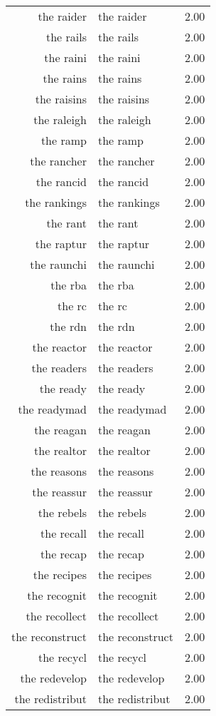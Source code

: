 \begin{table}[ht]
\begin{tabular}{rlr}
  the raider & the raider & 2.00 \\ 
  the rails & the rails & 2.00 \\ 
  the raini & the raini & 2.00 \\ 
  the rains & the rains & 2.00 \\ 
  the raisins & the raisins & 2.00 \\ 
  the raleigh & the raleigh & 2.00 \\ 
  the ramp & the ramp & 2.00 \\ 
  the rancher & the rancher & 2.00 \\ 
  the rancid & the rancid & 2.00 \\ 
  the rankings & the rankings & 2.00 \\ 
  the rant & the rant & 2.00 \\ 
  the raptur & the raptur & 2.00 \\ 
  the raunchi & the raunchi & 2.00 \\ 
  the rba & the rba & 2.00 \\ 
  the rc & the rc & 2.00 \\ 
  the rdn & the rdn & 2.00 \\ 
  the reactor & the reactor & 2.00 \\ 
  the readers & the readers & 2.00 \\ 
  the ready & the ready & 2.00 \\ 
  the readymad & the readymad & 2.00 \\ 
  the reagan & the reagan & 2.00 \\ 
  the realtor & the realtor & 2.00 \\ 
  the reasons & the reasons & 2.00 \\ 
  the reassur & the reassur & 2.00 \\ 
  the rebels & the rebels & 2.00 \\ 
  the recall & the recall & 2.00 \\ 
  the recap & the recap & 2.00 \\ 
  the recipes & the recipes & 2.00 \\ 
  the recognit & the recognit & 2.00 \\ 
  the recollect & the recollect & 2.00 \\ 
  the reconstruct & the reconstruct & 2.00 \\ 
  the recycl & the recycl & 2.00 \\ 
  the redevelop & the redevelop & 2.00 \\ 
  the redistribut & the redistribut & 2.00 \\ 

\end{tabular}
\end{table}
